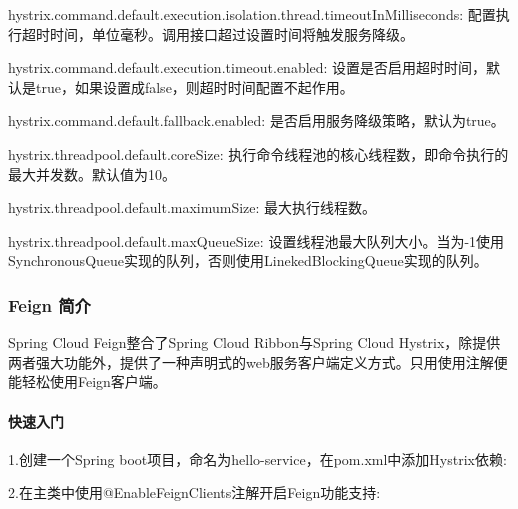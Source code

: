 \documentclass[letterpaper,10pt,english]{sphinxmanual}
\begin{document}
hystrix.command.default.execution.isolation.thread.timeoutInMilliseconds: 配置执行超时时间，单位毫秒。调用接口超过设置时间将触发服务降级。

hystrix.command.default.execution.timeout.enabled: 设置是否启用超时时间，默认是true，如果设置成false，则超时时间配置不起作用。

hystrix.command.default.fallback.enabled: 是否启用服务降级策略，默认为true。

hystrix.threadpool.default.coreSize: 执行命令线程池的核心线程数，即命令执行的最大并发数。默认值为10。

hystrix.threadpool.default.maximumSize: 最大执行线程数。

hystrix.threadpool.default.maxQueueSize: 设置线程池最大队列大小。当为-1使用SynchronousQueue实现的队列，否则使用LinekedBlockingQueue实现的队列。


\subsubsection{Feign 简介}
\label{\detokenize{01.spring-cloud/03.feign/feign_03:feign}}\label{\detokenize{01.spring-cloud/03.feign/feign_03::doc}}
Spring Cloud Feign整合了Spring Cloud Ribbon与Spring Cloud Hystrix，除提供两者强大功能外，提供了一种声明式的web服务客户端定义方式。只用使用注解便能轻松使用Feign客户端。


\paragraph{快速入门}
\label{\detokenize{01.spring-cloud/03.feign/feign_03:id1}}
1.创建一个Spring boot项目，命名为hello-service，在pom.xml中添加Hystrix依赖:

\begin{sphinxVerbatim}[commandchars=\\\{\}]
\end{sphinxVerbatim}

2.在主类中使用@EnableFeignClients注解开启Feign功能支持:
\end{document}

